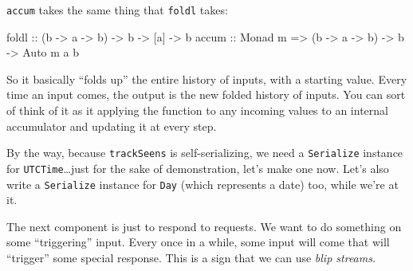 \documentclass[]{article}
\newenvironment{Shaded}{}{}
\newcommand{\KeywordTok}[1]{\textcolor[rgb]{0.00,0.44,0.13}{\textbf{{#1}}}}
\newcommand{\DataTypeTok}[1]{\textcolor[rgb]{0.56,0.13,0.00}{{#1}}}
\newcommand{\CommentTok}[1]{\textcolor[rgb]{0.38,0.63,0.69}{\textit{{#1}}}}
\newcommand{\OtherTok}[1]{\textcolor[rgb]{0.00,0.44,0.13}{{#1}}}
\newcommand{\FunctionTok}[1]{\textcolor[rgb]{0.02,0.16,0.49}{{#1}}}
\newcommand{\NormalTok}[1]{{#1}}
\begin{document}
\texttt{accum} takes the same thing that \texttt{foldl} takes:

\begin{Shaded}
\begin{Highlighting}[]
\NormalTok{foldl}\OtherTok{ ::}            \NormalTok{(b }\OtherTok{->} \NormalTok{a }\OtherTok{->} \NormalTok{b) }\OtherTok{->} \NormalTok{b }\OtherTok{->} \NormalTok{[a] }\OtherTok{->} \NormalTok{b}
\OtherTok{accum ::} \DataTypeTok{Monad} \NormalTok{m }\OtherTok{=>} \NormalTok{(b }\OtherTok{->} \NormalTok{a }\OtherTok{->} \NormalTok{b) }\OtherTok{->} \NormalTok{b }\OtherTok{->} \DataTypeTok{Auto} \NormalTok{m a b}
\end{Highlighting}
\end{Shaded}

So it basically ``folds up'' the entire history of inputs, with a
starting value. Every time an input comes, the output is the new folded
history of inputs. You can sort of think of it as it applying the
function to any incoming values to an internal accumulator and updating
it at every step.

By the way, because \texttt{trackSeens} is self-serializing, we need a
\texttt{Serialize} instance for \texttt{UTCTime}\ldots{}just for the
sake of demonstration, let's make one now. Let's also write a
\texttt{Serialize} instance for \texttt{Day} (which represents a date)
too, while we're at it.

\begin{Shaded}
\end{Shaded}

The next component is just to respond to requests. We want to do
something on some ``triggering'' input. Every once in a while, some
input will come that will ``trigger'' some special response. This is a
sign that we can use \emph{blip streams}.
\end{document}
